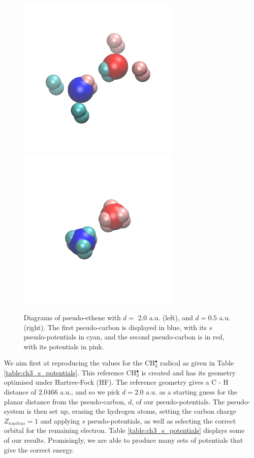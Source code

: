 \documentclass[journal=jctcce,manuscript=article]{achemso}
\begin{document}
\begin{figure}
\includegraphics[width=8cm, height=8cm]{hires_long_r.png}
\includegraphics[width=8cm, height=8cm]{hires_short_r.png}
\caption{Diagrams of pseudo-ethene with \(d =\) 2.0 a.u. (left), and \(d = 0.5\) a.u. (right). The first pseudo-carbon is displayed in blue, with its \(s\) pseudo-potentials in cyan, and the second pseudo-carbon is in red, with its potentials in pink.}
\label{fig:long_r_ethene}
\end{figure}

We aim first at reproducing the values for the CH\(^{\bullet}_{3}\) radical as given in Table \ref{table:ch3_s_potentials}. 
This reference CH\(^{\bullet}_{3}\) is created and has its geometry optimised under Hartree-Fock (HF). The reference geometry gives a C - H distance of 2.0466 a.u., and so we pick \(d = 2.0\) a.u. as a starting guess for the planar distance from the pseudo-carbon, \(d\), of our pseudo-potentials. The pseudo-system is then set up, erasing the hydrogen atoms, setting the carbon charge \(Z_{nucleus} = 1\) and applying \(s\) pseudo-potentials, as well as selecting the correct orbital for the remaining electron. Table \ref{table:ch3_s_potentials} displays some of our results. Promisingly, we are able to produce many sets of potentials that give the correct energy.
\end{document}
